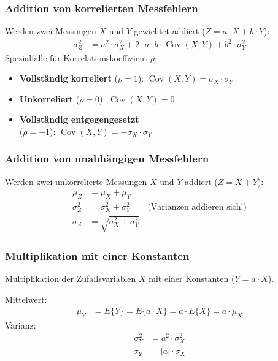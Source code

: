     \subsubsection{Addition von korrelierten Messfehlern}
        Werden zwei Messungen $X$ und $Y$ gewichtet addiert ($Z = a \cdot X + b \cdot Y$):
        \begin{align*}
            \sigma_Z^2 &= a^2 \cdot \sigma_X^2 + 2 \cdot a \cdot b \cdot \operatorname{Cov}(X,Y) + b^2 \cdot \sigma_Y^2
        \end{align*}
        Spezialfälle für Korrelationskoeffizient $\rho$:
        \begin{itemize}
            \item \textbf{Vollständig korreliert} ($\rho=1$): $\operatorname{Cov}(X,Y) = \sigma_X \cdot \sigma_Y$
            \item \textbf{Unkorreliert} ($\rho=0$): $\operatorname{Cov}(X,Y) = 0$
            \item \textbf{Vollständig entgegengesetzt} \\
            ($\rho=-1$): $\operatorname{Cov}(X,Y) = -\sigma_X \cdot \sigma_Y$
        \end{itemize}

    \subsubsection{Addition von unabhängigen Messfehlern}
        Werden zwei unkorrelierte Messungen $X$ und $Y$ addiert ($Z = X + Y$):
        \begin{align*}
            \mu_Z &= \mu_X + \mu_Y \\
            \sigma_Z^2 &= \sigma_X^2 + \sigma_Y^2 \qquad \text{(Varianzen addieren sich!)} \\
            \sigma_Z &= \sqrt{\sigma_X^2 + \sigma_Y^2}
        \end{align*}

    \subsubsection{Multiplikation mit einer Konstanten}
        Multiplikation der Zufallsvariablen $X$ mit einer Konstanten ($Y = a \cdot X$).
        
        Mittelwert:
        \begin{align*}
            \mu_Y &= E\{Y\} = E\{a \cdot X\} = a \cdot E\{X\} = a \cdot \mu_X
        \end{align*}
        Varianz:
        \begin{align*}
            \sigma_Y^2 &= a^2 \cdot \sigma_X^2
        \end{align*}
        \begin{align*}
            \sigma_Y &= |a| \cdot \sigma_X
        \end{align*}

